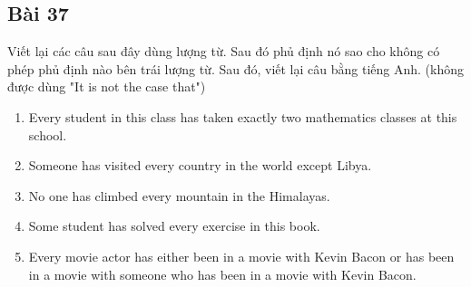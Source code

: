 \subsection*{Bài 37}
Viết lại các câu sau đây dùng lượng từ. Sau đó phủ định nó sao cho không có phép phủ định nào bên trái lượng từ. Sau đó, viết lại câu bằng tiếng Anh. (không được dùng "It is not the case that")
\begin{enumerate}[label=\alph*)]
    \item Every student in this class has taken exactly two mathematics classes at this school.
    \item Someone has visited every country in the world except Libya.
    \item No one has climbed every mountain in the Himalayas.
    \item Some student has solved every exercise in this book.
    \item Every movie actor has either been in a movie with Kevin Bacon or has been in a movie with someone who has been in a movie with Kevin Bacon.
\end{enumerate}
